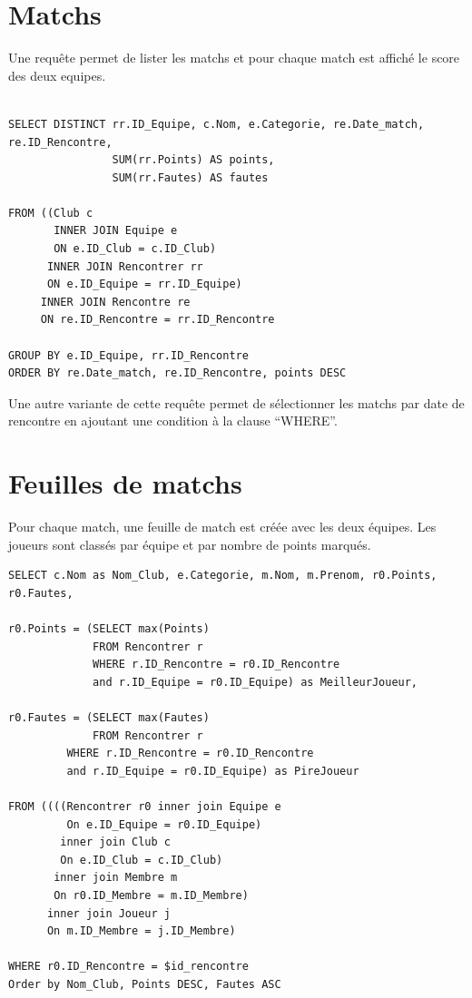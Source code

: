 \documentclass[a4paper»,8pt,french,fleqn]{report}
\begin{document}
\section{Matchs}
Une requête permet de lister les matchs et pour chaque match est affiché le score des deux equipes.

\begin{lstlisting}

SELECT DISTINCT rr.ID_Equipe, c.Nom, e.Categorie, re.Date_match, re.ID_Rencontre,
                SUM(rr.Points) AS points, 
                SUM(rr.Fautes) AS fautes 
		                      
FROM ((Club c
       INNER JOIN Equipe e
       ON e.ID_Club = c.ID_Club) 
      INNER JOIN Rencontrer rr
      ON e.ID_Equipe = rr.ID_Equipe)
     INNER JOIN Rencontre re
     ON re.ID_Rencontre = rr.ID_Rencontre

GROUP BY e.ID_Equipe, rr.ID_Rencontre
ORDER BY re.Date_match, re.ID_Rencontre, points DESC

\end{lstlisting}

Une autre variante de cette requête permet de sélectionner les matchs par date de rencontre en ajoutant une condition à la clause ``WHERE''.


\section{Feuilles de matchs}

Pour chaque match, une feuille de match est créée avec les deux équipes. Les joueurs sont classés par équipe et par nombre de points marqués.

\begin{lstlisting}
SELECT c.Nom as Nom_Club, e.Categorie, m.Nom, m.Prenom, r0.Points, r0.Fautes, 

r0.Points = (SELECT max(Points) 
             FROM Rencontrer r
             WHERE r.ID_Rencontre = r0.ID_Rencontre
             and r.ID_Equipe = r0.ID_Equipe) as MeilleurJoueur,

r0.Fautes = (SELECT max(Fautes) 
             FROM Rencontrer r
	     WHERE r.ID_Rencontre = r0.ID_Rencontre
	     and r.ID_Equipe = r0.ID_Equipe) as PireJoueur 
								
FROM ((((Rencontrer r0 inner join Equipe e
         On e.ID_Equipe = r0.ID_Equipe) 
        inner join Club c            
        On e.ID_Club = c.ID_Club) 
       inner join Membre m
       On r0.ID_Membre = m.ID_Membre) 
      inner join Joueur j
      On m.ID_Membre = j.ID_Membre)

WHERE r0.ID_Rencontre = $id_rencontre
Order by Nom_Club, Points DESC, Fautes ASC
\end{lstlisting}
\end{document}
